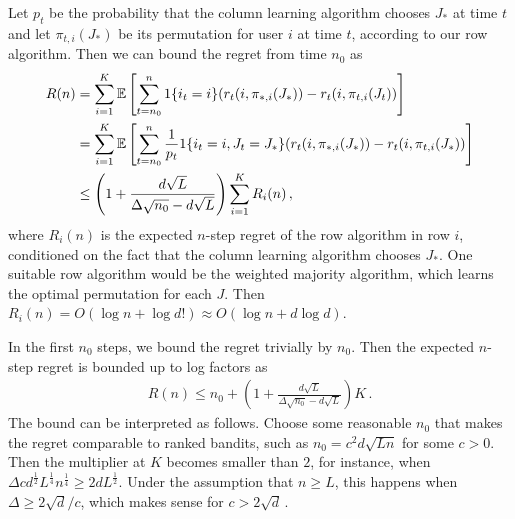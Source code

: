 Let $p_t$ be the probability that the column learning algorithm chooses $J_\ast$ at time $t$ and let $\pi_{t, i}(J_\ast)$ be its permutation for user $i$ at time $t$, according to our row algorithm. Then we can bound the regret from time $n_0$ as
\begin{align*}
  R(n)
  & = \sum_{i = 1}^K \mathbb{E}\left[\sum_{t = n_0}^n 1\{i_t = i\}
  (r_t(i, \pi_{\ast, i}(J_\ast)) - r_t(i, \pi_{t, i}(J_t))\right] \\
  & = \sum_{i = 1}^K \mathbb{E}\left[\sum_{t = n_0}^n \frac{1}{p_t} 1\{i_t = i, J_t = J_\ast\}
  (r_t(i, \pi_{\ast, i}(J_\ast)) - r_t(i, \pi_{t, i}(J_\ast))\right] \\
  & \leq \left(1 + \frac{d \sqrt{L}}{\Delta \sqrt{n_0} - d \sqrt{L}}\right) \sum_{i = 1}^K R_i(n)\,,
\end{align*}
where $R_i(n)$ is the expected $n$-step regret of the row algorithm in row $i$, conditioned on the fact that the column learning algorithm chooses $J_\ast$. One suitable row algorithm would be the weighted majority algorithm, which learns the optimal permutation for each $J$. Then $R_i(n) = O(\log n + \log d!) \approx O(\log n + d \log d)$.

In the first $n_0$ steps, we bound the regret trivially by $n_0$. Then the expected $n$-step regret is bounded up to log factors as
\begin{align*}
  R(n) \leq
  n_0 + \left(1 + \frac{d \sqrt{L}}{\Delta \sqrt{n_0} - d \sqrt{L}}\right) K\,.
\end{align*}
The bound can be interpreted as follows. Choose some reasonable $n_0$ that makes the regret comparable to ranked bandits, such as $n_0 = c^2 d \sqrt{L n}$ for some $c > 0$. Then the multiplier at $K$ becomes smaller than $2$, for instance, when $\Delta c d^\frac{1}{2} L^\frac{1}{4} n^\frac{1}{4} \geq 2 d L^\frac{1}{2}$. Under the assumption that $n \geq L$, this happens when $\Delta \geq 2 \sqrt{d} / c$, which makes sense for $c > 2 \sqrt{d}$\,.

